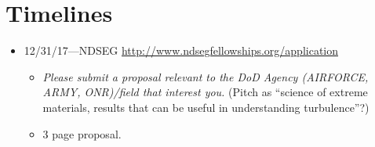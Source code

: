 \documentclass[11pt,
        usenames, %
        dvipsnames %
    ]{article}
\begin{document}
\def\Snospace~{\S{}} %
\renewcommand*{\sectionautorefname}{\Snospace}
\renewcommand*{\appendixautorefname}{\Snospace}
\renewcommand*{\figureautorefname}{Fig.}
\renewcommand*{\equationautorefname}{Eq.}
\renewcommand*{\tableautorefname}{Tab.}

\section*{Timelines}

\begin{itemize}
    \item 12/31/17---NDSEG \url{http://www.ndsegfellowships.org/application}
        \begin{itemize}
            \item \emph{Please submit a proposal relevant to the DoD Agency
                (AIRFORCE, ARMY, ONR)/field that interest you.} (Pitch as
                ``science of extreme materials, results that can be useful in
                understanding turbulence''?)
            \item 3 page proposal.
        \end{itemize}


\end{itemize}
\end{document}
